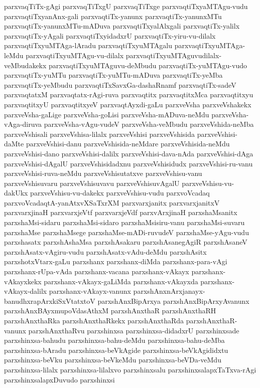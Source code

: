 {parxvaqTiTx-gAgi
parxvaqTiTxgU
parxvaqTiTxge
parxvaqtiTxyaMTAgu-vudu
parxvaqtiTxyanAnx-gali
parxvaqtiTx-yanunx
parxvaqtiTx-yanunxMTu
parxvaqtiTx-yanunxMTu-mADuva
parxvaqtiTxyalAlxgali
parxvaqtiTx-yalilx
parxvaqtiTx-yAgali
parxvaqtiTxyidadxrU
parxvaqtiTx-yiru-vu-dilalx
parxvaqtiTxyuMTAga-lAradu
parxvaqtiTxyuMTAgalu
parxvaqtiTxyuMTAga-leMdu
parxvaqtiTxyuMTAgu-vu-dilalx
parxvaqtiTxyuMTAguvudilalx-veMbudakekx
parxvaqtiTxyuMTAguvu-deMbudu
parxvaqtiTx-yuMTAgu-vudo
parxvaqtiTx-yuMTu
parxvaqtiTx-yuMTu-mADuva
parxvaqtiTx-yeMba
parxvaqtiTx-yeMbudu
parxvaqtiTxSavxGa-dashaRnamf
parxvaqtiTx-sadeV
parxvaqtatxM
parxvaqtatx-rAgi-ruva
parxvaqtitx
parxvaqtitxMca
parxvaqtitxyu
parxvaqtitxyU
parxvaqtitxyeV
parxvaqtAyxdi-gaLu
parxveVsha
parxveVshakekx
parxveVsha-gaLige
parxveVsha-goLisi
parxveVsha-mADuva-neMdu
parxveVsha-vAga-diruva
parxveVsha-vAgu-vudeV
parxveVsha-veMbudu
parxveVshida-neMba
parxveVshisali
parxveVshisa-lilalx
parxveVshisi
parxveVshisida
parxveVshisi-daMte
parxveVshisi-danu
parxveVshisida-neMdare
parxveVshisida-neMdu
parxveVshisi-dano
parxveVshisi-dalilx
parxveVshisi-dava-nAda
parxveVshisi-dAga
parxveVshisi-dAgalU
parxveVshisidadxnu
parxveVshisidudx
parxveVshisi-ru-vanu
parxveVshisi-ruva-neMdu
parxveVshisutatxve
parxveVshisu-vanu
parxveVshisuvaru
parxveVshisuvavu
parxveVshisuvAgalU
parxveVshisu-vu-dakUkx
parxveVshisu-vu-dakekx
parxveVshisu-vudu
parxvoVcadaq
parxvoVcadaqtA-yanAtxvXSaTxrXM
parxvarxjanitx
parxvarxjanitxV
parxvarxjinaH
parxvarxjeVtf
parxvarxjeVdf
parxvArxjinaH
parxshaMsanitx
parxshaMsi-sidaru
parxshaMsi-sidaro
parxshaMsisiru-vanu
parxshaMsi-suvaru
parxshaMse
parxshaMsege
parxshaMse-mADi-ruvudeV
parxshaMse-yAgu-vudu
parxshasatx
parxshAshaMsa
parxshAsakaru
parxshAsanegAgiR
parxshAsaneV
parxshAsatx-vAgiru-vudu
parxshAsatx-vAdu-deMdu
parxshAsitx
parxshotxVtarx-gaLu
parxshanx
parxshanx-diMda
parxshanx-para-vAgi
parxshanx-rUpa-vAda
parxshanx-vacana
parxshanx-vAkayx
parxshanx-vAkayxkekx
parxshanx-vAkayx-gaLiMda
parxshanx-vAkayxda
parxshanx-vAkayx-dalilx
parxshanx-vAkayx-vanunx
parxshAnxnArxjanayx-banudhxrapArxkiSxVtatxtoV
parxshAnxBipArxya
parxshAnxBipArxyAvanunx
parxshAnxBAyxmupoVdasAthxM
parxshAnxthaR
parxshAnxthaRH
parxshAnxthaRka
parxshAnxthaRkekx
parxshAnxthaRda
parxshAnxthaR-vanunx
parxshAnxthaRvu
parxshinxsa
parxshinxsa-didadxrU
parxshinxsade
parxshinxsa-bahudu
parxshinxsa-bahu-deMdu
parxshinxsa-bahu-deMba
parxshinxsa-bAradu
parxshinxsa-beVkAgide
parxshinxsa-beVkAgididxtu
parxshinxsa-beVku
parxshinxsa-beVkeMdu
parxshinxsa-beVDa-veMdu
parxshinxsa-lilalx
parxshinxsa-lilalxvo
parxshinxsalu
parxshinxsalapxTaTxva-rAgi
parxshinxsalapxDuvudo
parxshinxsi
}
